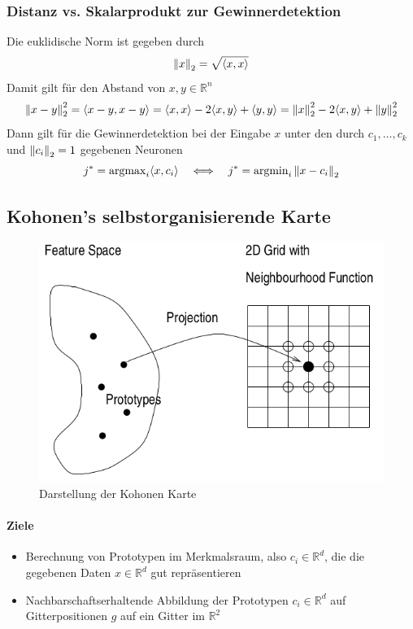 \subsubsection{Distanz vs. Skalarprodukt zur Gewinnerdetektion}
Die euklidische Norm ist gegeben durch
\begin{equation*}
    \left\lVert x\right\rVert_2 = \sqrt{\langle x,x \rangle}
\end{equation*}
Damit gilt für den Abstand von $x,y\in\mathbb{R}^n$
\begin{equation*}
    \left\lVert x-y\right\rVert_2^2 = \langle x-y,x-y \rangle = \langle x,x\rangle -2\langle x,y\rangle + \langle y,y\rangle = \left\lVert x\right\rVert_2^2 - 2\langle x,y \rangle + \left\lVert y\right\rVert_2^2
\end{equation*}
Dann gilt für die Gewinnerdetektion bei der Eingabe $x$ unter den durch $c_1,\dots,c_k$ und $\left\lVert c_i\right\rVert_2=1$ gegebenen Neuronen 
\begin{equation*}
    j^* = \operatorname{argmax}_i \langle x,c_i \rangle \quad \Longleftrightarrow \quad j^* = \operatorname{argmin}_i \left\lVert x-c_i\right\rVert_2
\end{equation*}

\subsection{Kohonen's selbstorganisierende Karte}
\begin{figure}[h]
    \centering
    \includegraphics[width=.33\textwidth]{img/NeuroLernregel/SOM.png}
    \caption{Darstellung der Kohonen Karte}
    \label{ch_lern_SOM}
\end{figure}
\paragraph{Ziele}
\begin{itemize}
    \item Berechnung von Prototypen im Merkmalsraum, also $c_i \in \mathbb{R}^d$, die die gegebenen Daten $x\in\mathbb{R}^d$ gut repräsentieren
    \item Nachbarschaftserhaltende Abbildung der Prototypen $c_i\in\mathbb{R}^d$ auf Gitterpositionen $g$ auf ein Gitter im $\mathbb{R}^2$
\end{itemize}

